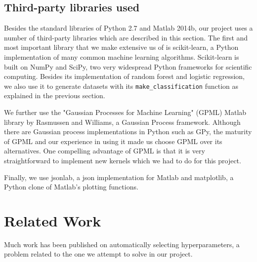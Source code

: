 \documentclass[a4paper,12pt,twoside,openright]{report}
\begin{document}
\section{Third-party libraries used}
Besides the standard libraries of Python 2.7 and Matlab 2014b, our project uses a number of third-party libraries which are described in this section. The first and most important library that we make extensive us of is scikit-learn, a Python implementation of many common machine learning algorithms. Scikit-learn is built on NumPy and SciPy, two very widespread Python frameworks for scientific computing. Besides its implementation of random forest and logistic regression, we also use it to generate datasets with its \texttt{make\_classification} function as explained in the previous section.

We further use the "Gaussian Processes for Machine Learning" (GPML) Matlab library by Rasmussen and Williams, a Gaussian Process framework. Although there are Gaussian process implementations in Python such as GPy, the maturity of GPML and our experience in using it made us choose GPML over its alternatives. One compelling advantage of GPML is that it is very straightforward to implement new kernels which we had to do for this project.

Finally, we use jsonlab, a json implementation for Matlab and matplotlib, a Python clone of Matlab's plotting functions.



\chapter{Related Work} 
Much work has been published on automatically selecting hyperparameters, a problem related to the one we attempt to solve in our project.












\end{document}

